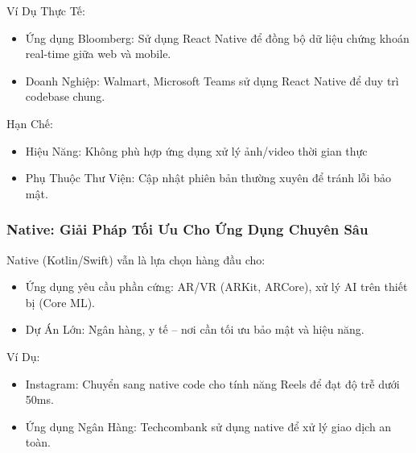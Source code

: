     \begin{flushleft}
      \hspace*{0.8cm}Ví Dụ Thực Tế:
      \setlength{\leftmargini}{1.5cm}
      \begin{itemize}
          \item Ứng dụng Bloomberg: Sử dụng React Native để đồng bộ dữ liệu chứng khoán real-time giữa web và mobile.
          \item Doanh Nghiệp: Walmart, Microsoft Teams sử dụng React Native để duy trì codebase chung.
      \end{itemize}
    \end{flushleft}

    \begin{flushleft}
      \hspace*{0.8cm}Hạn Chế:
      \setlength{\leftmargini}{1.5cm}
      \begin{itemize}
          \item Hiệu Năng: Không phù hợp ứng dụng xử lý ảnh/video thời gian thực
          \item Phụ Thuộc Thư Viện: Cập nhật phiên bản thường xuyên để tránh lỗi bảo mật.
      \end{itemize}
    \end{flushleft}

    \subsubsection{Native: Giải Pháp Tối Ưu Cho Ứng Dụng Chuyên Sâu}
    \begin{flushleft}
      \hspace*{0.8cm}Native (Kotlin/Swift) vẫn là lựa chọn hàng đầu cho:
      \setlength{\leftmargini}{1.5cm}
      \begin{itemize}
        \item Ứng dụng yêu cầu phần cứng: AR/VR (ARKit, ARCore), xử lý AI trên thiết bị (Core ML).
        \item Dự Án Lớn: Ngân hàng, y tế – nơi cần tối ưu bảo mật và hiệu năng.
      \end{itemize}
    \end{flushleft}

    \begin{flushleft}
      \hspace*{0.8cm}Ví Dụ:
      \setlength{\leftmargini}{1.5cm}
      \begin{itemize}
          \item Instagram: Chuyển sang native code cho tính năng Reels để đạt độ trễ dưới 50ms.
          \item Ứng dụng Ngân Hàng: Techcombank sử dụng native để xử lý giao dịch an toàn.
      \end{itemize}
    \end{flushleft}

